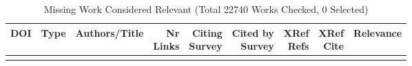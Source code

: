 {\scriptsize
\begin{longtable}{p{5cm}lp{11cm}rrrrrr}
\caption{Missing Work Considered Relevant (Total 22740 Works Checked, 0 Selected)}\\ \toprule
DOI & Type & Authors/Title & \shortstack{Nr\\Links} & \shortstack{Citing\\Survey} & \shortstack{Cited by\\Survey} & \shortstack{XRef\\Refs} & \shortstack{XRef\\Cite} & Relevance\\ \midrule\endhead
\bottomrule
\endfoot
\end{longtable}
}

